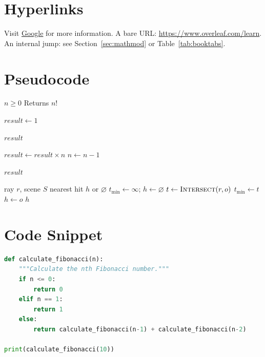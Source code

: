 \documentclass[11pt,a4paper]{article}
\theoremstyle{plain}
\theoremstyle{definition}
\theoremstyle{remark}
\begin{document}
\section{Hyperlinks}
Visit \href{https://www.google.com}{Google} for more information.
A bare URL: \url{https://www.overleaf.com/learn}.
An internal jump: see Section~\ref{sec:mathmod} or Table~\ref{tab:booktabs}.

\section{Pseudocode}
\begin{algorithm}[ht]
\caption{Calculate Factorial}
\label{alg:factorial}
\begin{algorithmic}[1] %
    \Require $n \geq 0$
    \Ensure Returns $n!$

    \State $result \gets 1$

        \State \Return $result$
    \EndIf

        \State $result \gets result \times n$
        \State $n \gets n - 1$
    \EndWhile

    \State \Return $result$
\end{algorithmic}
\end{algorithm}

\begin{algorithm}[ht]
\caption{Ray--Scene Intersection (new example)}
\label{alg:raycast}
\begin{algorithmic}[1]
    \Require ray $r$, scene $S$
    \Ensure nearest hit $h$ or $\varnothing$
    \State $t_{\min} \gets \infty$; \quad $h \gets \varnothing$
        \State $t \gets \Call{Intersect}{r, o}$
            \State $t_{\min} \gets t$
            \State $h \gets o$
        \EndIf
    \EndFor
    \State \Return $h$
\end{algorithmic}
\end{algorithm}

\section{Code Snippet}
\begin{lstlisting}[language=Python, caption=A simple Python function]
def calculate_fibonacci(n):
    """Calculate the nth Fibonacci number."""
    if n <= 0:
        return 0
    elif n == 1:
        return 1
    else:
        return calculate_fibonacci(n-1) + calculate_fibonacci(n-2)

print(calculate_fibonacci(10))
\end{lstlisting}
\end{document}
